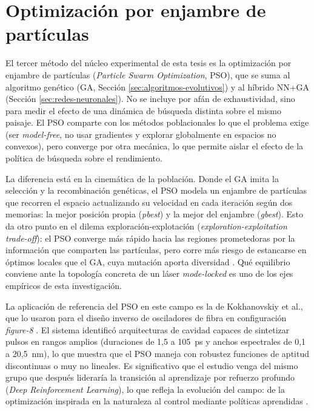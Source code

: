 \section{Optimización por enjambre de partículas}
\label{sec:pso_estado_arte}

El tercer método del núcleo experimental de esta tesis es la optimización por enjambre de partículas (\emph{Particle Swarm Optimization}, PSO), que se suma al algoritmo genético (GA, Sección \ref{sec:algoritmos-evolutivos}) y al híbrido NN+GA (Sección \ref{sec:redes-neuronales}). No se incluye por afán de exhaustividad, sino para medir el efecto de una dinámica de búsqueda distinta sobre el mismo paisaje. El PSO comparte con los métodos poblacionales lo que el problema exige (ser \emph{model-free}, no usar gradientes y explorar globalmente en espacios no convexos), pero converge por otra mecánica, lo que permite aislar el efecto de la política de búsqueda sobre el rendimiento.

La diferencia está en la cinemática de la población. Donde el GA imita la selección y la recombinación genéticas, el PSO modela un enjambre de partículas que recorren el espacio actualizando su velocidad en cada iteración según dos memorias: la mejor posición propia (\emph{pbest}) y la mejor del enjambre (\emph{gbest}). Esto da otro punto en el dilema exploración-explotación (\emph{exploration-exploitation trade-off}): el PSO converge más rápido hacia las regiones prometedoras por la información que comparten las partículas, pero corre más riesgo de estancarse en óptimos locales que el GA, cuya mutación aporta diversidad \cite{Kennedy1995}. Qué equilibrio conviene ante la topología concreta de un láser \emph{mode-locked} es uno de los ejes empíricos de esta investigación.

La aplicación de referencia del PSO en este campo es la de Kokhanovskiy et al., que lo usaron para el diseño inverso de osciladores de fibra en configuración \emph{figure-8} \cite{Kokhanovskiy2021}. El sistema identificó arquitecturas de cavidad capaces de sintetizar pulsos en rangos amplios (duraciones de 1,5 a 105~ps y anchos espectrales de 0,1 a 20,5~nm), lo que muestra que el PSO maneja con robustez funciones de aptitud discontinuas o muy no lineales. Es significativo que el estudio venga del mismo grupo que después lideraría la transición al aprendizaje por refuerzo profundo (\emph{Deep Reinforcement Learning}), lo que refleja la evolución del campo: de la optimización inspirada en la naturaleza al control mediante políticas aprendidas \cite{Kokhanovskiy2022}.

